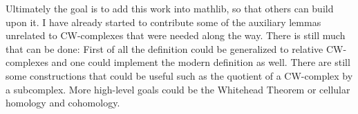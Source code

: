Ultimately the goal is to add this work into mathlib, so that others can build upon it. 
I have already started to contribute some of the auxiliary lemmas unrelated to CW-complexes that were needed along the way. 
There is still much that can be done: 
First of all the definition could be generalized to relative CW-complexes and one could implement the modern definition as well.
There are still some constructions that could be useful such as the quotient of a CW-complex by a subcomplex. 
More high-level goals could be the Whitehead Theorem or cellular homology and cohomology. 
